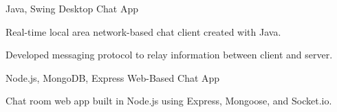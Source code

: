 

\begin{cventries}

  \cventry
  {Java, Swing} %
  {Desktop Chat App} %
  {} %
  {} %
  {
    \begin{cvitems}
      \item {Real-time local area network-based chat client created with Java.}
      \item {Developed messaging protocol to relay information between client and server.}
    \end{cvitems}
  }

  \cventry
  {Node.js, MongoDB, Express} %
  {Web-Based Chat App} %
  {} %
  {} %
  {
    \begin{cvitems}
      \item {Chat room web app built in Node.js using Express, Mongoose, and Socket.io.}
    \end{cvitems}
  }

\end{cventries}
